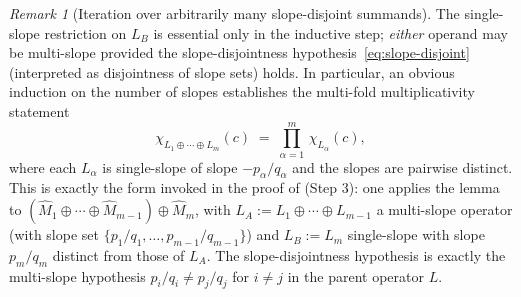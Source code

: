 \documentclass[11pt,a4paper]{article}
\theoremstyle{plain}
\theoremstyle{definition}
\theoremstyle{remark}
\newtheorem{remark}[theorem]{Remark}
\begin{document}
\begin{remark}[Iteration over arbitrarily many slope-disjoint summands]
\label{rem:chi-mult-iteration}
The single-slope restriction on $L_B$ is essential only in the
inductive step; \emph{either} operand may be multi-slope provided the
slope-disjointness hypothesis~\eqref{eq:slope-disjoint} (interpreted as
disjointness of slope sets) holds. In particular, an obvious induction
on the number of slopes establishes the multi-fold multiplicativity
statement
\[
   \chi_{L_1 \oplus \cdots \oplus L_m}(c)
   \;=\;
   \prod_{\alpha=1}^{m}\, \chi_{L_\alpha}(c),
\]
where each $L_\alpha$ is single-slope of slope $-p_\alpha/q_\alpha$ and
the slopes are pairwise distinct. This is exactly the form invoked in
the proof of  (Step 3): one applies the lemma to
$(\widehat M_1 \oplus \cdots \oplus \widehat M_{m-1}) \oplus \widehat
M_m$, with $L_A := L_1 \oplus \cdots \oplus L_{m-1}$ a multi-slope
operator (with slope set $\{p_1/q_1, \dots, p_{m-1}/q_{m-1}\}$) and
$L_B := L_m$ single-slope with slope $p_m/q_m$ distinct from those of
$L_A$. The slope-disjointness hypothesis is exactly the multi-slope
hypothesis $p_i/q_i \neq p_j/q_j$ for $i \ne j$ in the parent operator
$L$.
\end{remark}
\end{document}
